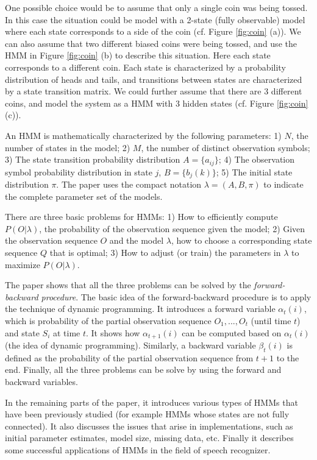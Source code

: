 \documentclass[paper=a4, fontsize=18pt]{article} %
\numberwithin{equation}{section} %
\numberwithin{figure}{section} %
\numberwithin{table}{section} %
\begin{document}
One possible choice would be to assume that only a single coin was being tossed. In this case the situation could be model with a 2-state (fully observable) model where each state corresponds to a side of the coin (cf. Figure \ref{fig:coin} (a)). We can also assume that two different biased coins were being tossed, and use the HMM in Figure \ref{fig:coin} (b) to describe this situation. Here each state corresponds to a different coin. Each state is characterized by a probability distribution of heads and tails, and transitions between states are characterized by a state transition matrix. We could further assume that there are 3 different coins, and model the system as a HMM with 3 hidden states (cf. Figure \ref{fig:coin} (c)).

An HMM is mathematically characterized by the following parameters: 1) $N$, the number of states in the model; 2) $M$, the number of distinct observation symbols; 3) The state transition probability distribution $A=\{a_{ij}\}$; 4) The observation symbol probability distribution in state $j$, $B = \{b_j(k)\}$; 5) The initial state distribution $\pi$. The paper uses the compact notation $\lambda = (A, B, \pi)$ to indicate the complete parameter set of the models.

There are three basic problems for HMMs: 1) How to efficiently compute $P(O| \lambda)$, the probability of the observation sequence given the model; 2) Given the observation sequence $O$ and the model $\lambda$, how to choose a corresponding state sequence $Q$ that is optimal; 3) How to adjust (or train) the parameters in $\lambda$ to maximize $P(O| \lambda)$.

The paper shows that all the three problems can be solved by the \emph{forward-backward procedure}. The basic idea of the forward-backward procedure is to apply the technique of dynamic programming. It introduces a forward variable $\alpha_t(i)$, which is probability of the partial observation sequence $O_1, ..., O_t$ (until time $t$) and state $S_i$ at time $t$. It shows how $\alpha_{t+1}(i)$ can be computed based on $\alpha_t(i)$ (the idea of dynamic programming). Similarly, a backward variable $\beta_t(i)$ is defined as the probability of the partial observation sequence from $t+1$ to the end. Finally, all the three problems can be solve by using the forward and backward variables.

In the remaining parts of the paper, it introduces various types of HMMs that have been previously studied (for example HMMs whose states are not fully connected). It also discusses the issues that arise in implementations, such as initial parameter estimates, model size, missing data, etc. Finally it describes some successful applications of HMMs in the field of speech recognizer.
\end{document}
